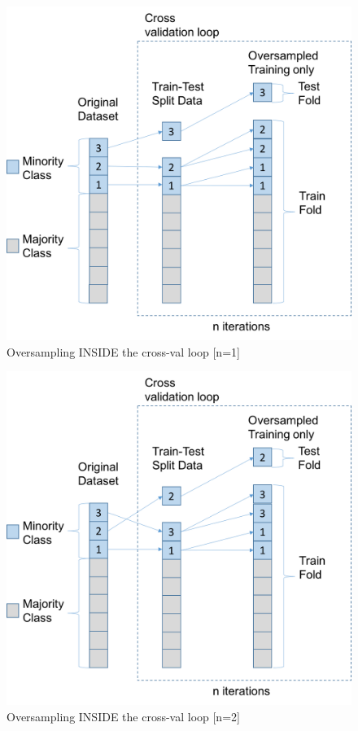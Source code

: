 \documentclass[12pt,a4paper,twoside]{report}
\begin{document}
\begin{figure}[H]
\centering
\includegraphics[scale=0.8]{oversample-after-1}
\caption{Oversampling INSIDE the cross-val loop [n=1]}
\label{fig:oversample-after-1}
\end{figure}

\begin{figure}[H]
\centering
\includegraphics[scale=0.8]{oversample-after-2}
\caption{Oversampling INSIDE the cross-val loop [n=2]}
\label{fig:oversample-after-2}
\end{figure}
\end{document}

